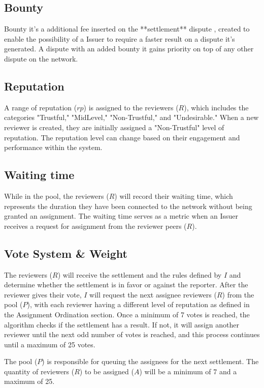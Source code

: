 \documentclass{article}
\begin{document}
\subsection{Bounty}

Bounty it's a additional fee inserted on the **settlement** dispute , created to enable the possibility of a Issuer to 
require a faster result on a dispute it's generated. A dispute with an added bounty it gains priority on top of any other 
dispute on the network.

\subsection{Reputation}
A range of reputation (\(rp\)) is assigned to the reviewers (\(R\)), which includes the categories "Trustful," "MidLevel," "Non-Trustful," and "Undesirable." When a new reviewer is created, they are initially assigned a "Non-Trustful" level of reputation. The reputation level can change based on their engagement and performance within the system.

\subsection{Waiting time}

While in the pool, the reviewers (\(R\)) will record their waiting time, which represents the duration they have been connected to the network without being granted an assignment. The waiting time serves as a metric when an Issuer receives a request for assignment from the reviewer peers (\(R\)).


\subsection{Vote System \& Weight}

The reviewers (\(R\)) will receive the settlement and the rules defined by \(I\) and determine whether the settlement is in favor or against the reporter. After the reviewer gives their vote, \(I\) will request the next assignee reviewers (\(R\)) from the pool (\(P\)), with each reviewer having a different level of reputation as defined in the Assignment Ordination section. Once a minimum of 7 votes is reached, the algorithm checks if the settlement has a result. If not, it will assign another reviewer until the next odd number of votes is reached, and this process continues until a maximum of 25 votes.

The pool (\(P\)) is responsible for queuing the assignees for the next settlement. The quantity of reviewers (\(R\)) to be assigned (\(A\)) will be a minimum of 7 and a maximum of 25.
\end{document}
